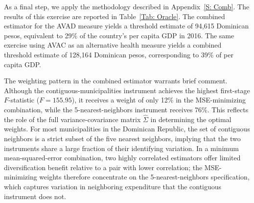 \documentclass[11pt]{article}
\numberwithin{equation}{section}
\theoremstyle{remark}
\begin{document}
\begin{table}[H]
    \caption{\label{Tab: TabIV_V2} Cost-effectiveness threshold, alternative IV strategies, AVAC 2016--2019}
    \centering
\end{table}


As a final step, we apply the methodology described in Appendix~\ref{S: Comb}. The results of this exercise are reported in Table~\ref{Tab: Oracle}. The combined estimator for the AVAD measure yields a threshold estimate of 94,615 Dominican pesos, equivalent to 29\% of the country's per capita GDP in 2016. The same exercise using AVAC as an alternative health measure yields a combined threshold estimate of 128,164 Dominican pesos, corresponding to 39\% of per capita GDP.

The weighting pattern in the combined estimator warrants brief comment. Although the contiguous-municipalities instrument achieves the highest first-stage $F$-statistic ($F = 155.95$), it receives a weight of only 12\% in the MSE-minimizing combination, while the 5-nearest-neighbors instrument receives 76\%. This reflects the role of the full variance-covariance matrix $\hat{\Sigma}$ in determining the optimal weights. For most municipalities in the Dominican Republic, the set of contiguous neighbors is a strict subset of the five nearest neighbors, implying that the two instruments share a large fraction of their identifying variation. In a minimum mean-squared-error combination, two highly correlated estimators offer limited diversification benefit relative to a pair with lower correlation; the MSE-minimizing weights therefore concentrate on the 5-nearest-neighbors specification, which captures variation in neighboring expenditure that the contiguous instrument does not.
\end{document}
